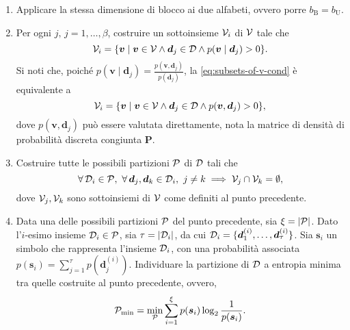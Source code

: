 \begin{enumerate}

    \item Applicare la stessa dimensione di blocco ai due alfabeti, ovvero
        porre \(b_\mathrm{B} = b_\mathrm{U}\).
        \label{itm:alphabets-sizes}

    \item Per ogni \(j,\,j = 1,\dots,\beta\), costruire un sottoinsieme
        \(\mathcal{V}_i\) di \(\mathcal{V}\) tale che
        \begin{equation}
            \set{V}_i = \mleft\{
                \bm{v} \mid \bm{v} \in \set{V} \land
                \bm{d}_j \in \set{D} \land
                p(\bm{v}\given\bm{d}_j)>0
                \mright\}. \label{eq:subsets-of-v-cond}
        \end{equation}
        Si noti che, poiché \(p(\bm{v}\mid\bm{d}_j) =
        \frac{p(\bm{v},\bm{d}_j)}{p(\bm{d}_j)}\), la
        \eqref{eq:subsets-of-v-cond} è equivalente a
        \begin{equation}
            \set{V}_i = \mleft\{
                \bm{v} \mid \bm{v} \in \set{V} \land
                \bm{d}_j \in \set{D} \land
                p(\bm{v},\bm{d}_j)>0
                \mright\}, \label{eq:subsets-of-v}
        \end{equation}
        dove \(p(\bm{v},\bm{d}_j)\) può essere valutata direttamente, nota la
        matrice di densità di probabilità discreta congiunta \(\bm{P}\).
        \label{itm:subsets-of-v}

    \item Costruire tutte le possibili partizioni \(\mathcal{P}\) di \(\mathcal{D}\)
        tali che
        \begin{equation}
            \forall \set{D}_i \in \set{P},\
            \forall \bm{d}_j,\bm{d}_k \in \set{D}_i,\
            j \neq k
            \implies \set{V}_j \cap \set{V}_k = \emptyset ,
            \label{eq:partitions-condition}
        \end{equation}
        dove \(\mathcal{V}_j,\mathcal{V}_k\) sono sottoinsiemi di \(\mathcal{V}\) come
        definiti al punto precedente.
        \label{itm:partitions-of-d}

    \item Data una delle possibili partizioni \(\mathcal{P}\) del punto precedente,
        sia \(\xi = \abs{\set{P}}\). Dato l'\(i\)-esimo insieme \(\mathcal{D}_i \in
        \mathcal{P}\), sia \(\tau = \abs{\set{D}_i}\), da cui \(\mathcal{D}_i =
        \{\bm{d}_1^{(i)},\dots,\bm{d}_\tau^{(i)}\}\). Sia \(\bm{s}_i\) un
        simbolo che rappresenta l'insieme \(\mathcal{D}_i\), con una probabilità
        associata \(p(\bm{s}_i) = \sum_{j=1}^\tau p(\bm{d}_j^{(i)})\).
        Individuare la partizione di \(\mathcal{D}\) a entropia minima tra quelle
        costruite al punto precedente, ovvero,
        \begin{equation}
            \mathcal{P}_\mathrm{min} = \min_{\mathcal{P}}
            \sum_{i=1}^\xi p(\bm{s}_i)\log_2\frac{1}{p(\bm{s}_i)}.
        \end{equation}
        \label{itm:partitions-entropy}

\end{enumerate}

